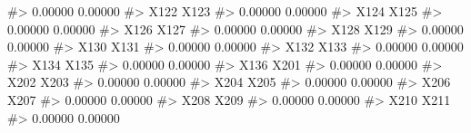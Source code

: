 \documentclass[
  letterpaper,
]{latex/krantz}
\makeatletter
\newenvironment{Shaded}{\begin{snugshade}}{\end{snugshade}}
\newcommand{\CommentTok}[1]{\textcolor[rgb]{0.37,0.37,0.37}{#1}}
\newenvironment{kframe}{%
\medskip{}
\setlength{\fboxsep}{.8em}
 \def\at@end@of@kframe{}%
 \ifinner\ifhmode%
  \def\at@end@of@kframe{\end{minipage}}%
  \begin{minipage}{\columnwidth}%
 \fi\fi%
 \def\FrameCommand##1{\hskip\@totalleftmargin \hskip-\fboxsep
 \colorbox{shadecolor}{##1}\hskip-\fboxsep
     \hskip-\linewidth \hskip-\@totalleftmargin \hskip\columnwidth}%
 \MakeFramed {\advance\hsize-\width
   \@totalleftmargin\z@ \linewidth\hsize
   \@setminipage}}%
 {\par\unskip\endMakeFramed%
 \at@end@of@kframe}
\renewenvironment{Shaded}{\begin{kframe}}{\end{kframe}}
\makeatother
\begin{document}
\begin{Shaded}
\begin{Highlighting}[]
\CommentTok{\#\textgreater{}                          0.00000                          0.00000 }
\CommentTok{\#\textgreater{}                             X122                             X123 }
\CommentTok{\#\textgreater{}                          0.00000                          0.00000 }
\CommentTok{\#\textgreater{}                             X124                             X125 }
\CommentTok{\#\textgreater{}                          0.00000                          0.00000 }
\CommentTok{\#\textgreater{}                             X126                             X127 }
\CommentTok{\#\textgreater{}                          0.00000                          0.00000 }
\CommentTok{\#\textgreater{}                             X128                             X129 }
\CommentTok{\#\textgreater{}                          0.00000                          0.00000 }
\CommentTok{\#\textgreater{}                             X130                             X131 }
\CommentTok{\#\textgreater{}                          0.00000                          0.00000 }
\CommentTok{\#\textgreater{}                             X132                             X133 }
\CommentTok{\#\textgreater{}                          0.00000                          0.00000 }
\CommentTok{\#\textgreater{}                             X134                             X135 }
\CommentTok{\#\textgreater{}                          0.00000                          0.00000 }
\CommentTok{\#\textgreater{}                             X136                             X201 }
\CommentTok{\#\textgreater{}                          0.00000                          0.00000 }
\CommentTok{\#\textgreater{}                             X202                             X203 }
\CommentTok{\#\textgreater{}                          0.00000                          0.00000 }
\CommentTok{\#\textgreater{}                             X204                             X205 }
\CommentTok{\#\textgreater{}                          0.00000                          0.00000 }
\CommentTok{\#\textgreater{}                             X206                             X207 }
\CommentTok{\#\textgreater{}                          0.00000                          0.00000 }
\CommentTok{\#\textgreater{}                             X208                             X209 }
\CommentTok{\#\textgreater{}                          0.00000                          0.00000 }
\CommentTok{\#\textgreater{}                             X210                             X211 }
\CommentTok{\#\textgreater{}                          0.00000                          0.00000 }

\end{Highlighting}
\end{Shaded}
\end{document}
